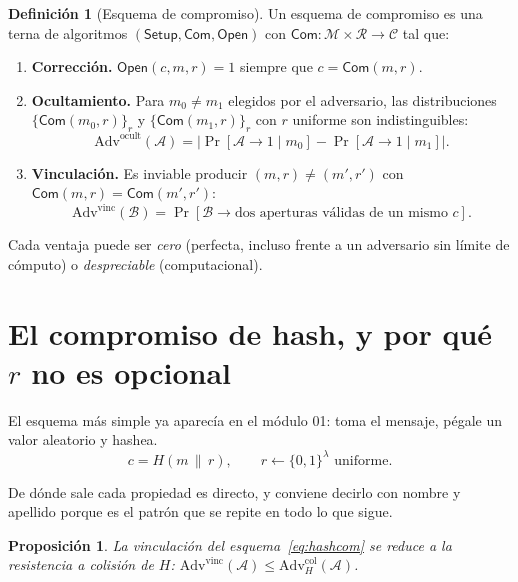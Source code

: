 \documentclass[11pt,a4paper]{article}
\theoremstyle{definition}
\newtheorem{definicion}{Definición}
\theoremstyle{plain}
\newtheorem{proposicion}{Proposición}
\theoremstyle{remark}
\newcommand{\bits}{\{0,1\}}
\newcommand{\concat}{\,\|\,}
\newcommand{\Adv}{\mathrm{Adv}}
\newcommand{\Com}{\mathsf{Com}}
\newcommand{\Open}{\mathsf{Open}}
\newcommand{\Setup}{\mathsf{Setup}}
\begin{document}
\begin{definicion}[Esquema de compromiso]
Un esquema de compromiso es una terna de algoritmos $(\Setup, \Com, \Open)$ con
$\Com : \mathcal{M} \times \mathcal{R} \to \mathcal{C}$ tal que:
\begin{enumerate}[label=(\roman*),leftmargin=2.2em,itemsep=0.2em]
  \item \textbf{Corrección.} $\Open(c, m, r) = 1$ siempre que $c = \Com(m,r)$.
  \item \textbf{Ocultamiento.} Para $m_0 \neq m_1$ elegidos por el adversario,
    las distribuciones $\{\Com(m_0,r)\}_r$ y $\{\Com(m_1,r)\}_r$ con $r$ uniforme
    son indistinguibles:
    \[
      \Adv^{\text{ocult}}(\mathcal{A}) =
      \bigl|\Pr[\mathcal{A} \to 1 \mid m_0] - \Pr[\mathcal{A} \to 1 \mid m_1]\bigr|.
    \]
  \item \textbf{Vinculación.} Es inviable producir $(m,r) \neq (m',r')$ con
    $\Com(m,r) = \Com(m',r')$:
    \[
      \Adv^{\text{vinc}}(\mathcal{B}) =
      \Pr[\mathcal{B} \to \text{dos aperturas válidas de un mismo } c].
    \]
\end{enumerate}
Cada ventaja puede ser \emph{cero} (perfecta, incluso frente a un adversario sin
límite de cómputo) o \emph{despreciable} (computacional).
\end{definicion}

\section{El compromiso de hash, y por qué $r$ no es opcional}

El esquema más simple ya aparecía en el módulo 01: toma el mensaje, pégale un
valor aleatorio y hashea.
\begin{equation}\label{eq:hashcom}
  c = H(m \concat r), \qquad r \leftarrow \bits^{\lambda} \text{ uniforme}.
\end{equation}

De dónde sale cada propiedad es directo, y conviene decirlo con nombre y apellido
porque es el patrón que se repite en todo lo que sigue.

\begin{proposicion}\label{prop:hashbind}
La vinculación del esquema~\eqref{eq:hashcom} se reduce a la resistencia a
colisión de $H$: $\Adv^{\text{vinc}}(\mathcal{A}) \le \Adv^{\text{col}}_H(\mathcal{A})$.
\end{proposicion}
\end{document}
